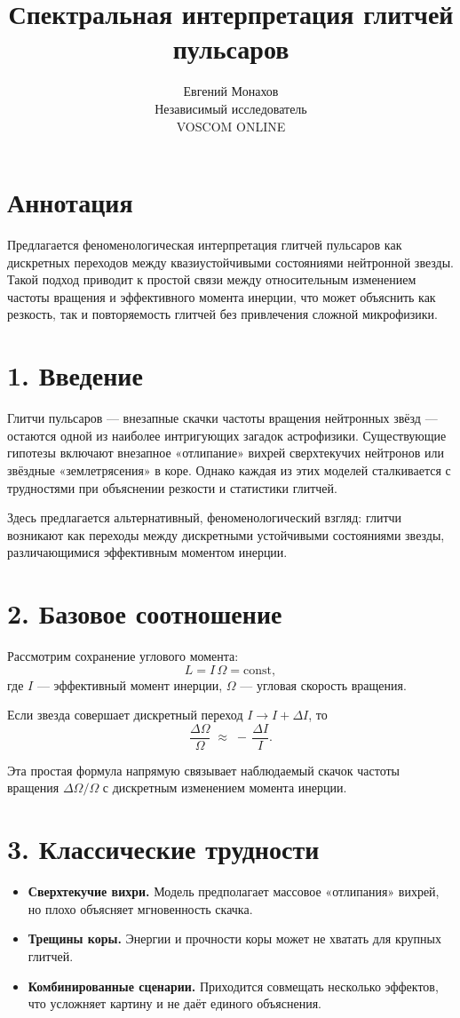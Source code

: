 \documentclass[a4paper,12pt]{article}
\begin{document}
\title{Спектральная интерпретация глитчей пульсаров}
\author{Евгений Монахов \\ Независимый исследователь \\ VOSCOM ONLINE}
\date{}
\maketitle

\section*{Аннотация}
Предлагается феноменологическая интерпретация глитчей пульсаров как дискретных переходов между квазиустойчивыми состояниями нейтронной звезды. Такой подход приводит к простой связи между относительным изменением частоты вращения и эффективного момента инерции, что может объяснить как резкость, так и повторяемость глитчей без привлечения сложной микрофизики.

\section*{1. Введение}
Глитчи пульсаров --- внезапные скачки частоты вращения нейтронных звёзд --- остаются одной из наиболее интригующих загадок астрофизики. Существующие гипотезы включают внезапное «отлипание» вихрей сверхтекучих нейтронов или звёздные «землетрясения» в коре. Однако каждая из этих моделей сталкивается с трудностями при объяснении резкости и статистики глитчей.

Здесь предлагается альтернативный, феноменологический взгляд: глитчи возникают как переходы между дискретными устойчивыми состояниями звезды, различающимися эффективным моментом инерции.

\section*{2. Базовое соотношение}
Рассмотрим сохранение углового момента:
\[
L = I \, \Omega = \text{const},
\]
где $I$ --- эффективный момент инерции, $\Omega$ --- угловая скорость вращения.

Если звезда совершает дискретный переход $I \to I + \Delta I$, то
\[
\frac{\Delta \Omega}{\Omega} \;\approx\; -\, \frac{\Delta I}{I}.
\]

Эта простая формула напрямую связывает наблюдаемый скачок частоты вращения $\Delta \Omega / \Omega$ с дискретным изменением момента инерции.

\section*{3. Классические трудности}
\begin{itemize}
  \item \textbf{Сверхтекучие вихри.} Модель предполагает массовое «отлипания» вихрей, но плохо объясняет мгновенность скачка.
  \item \textbf{Трещины коры.} Энергии и прочности коры может не хватать для крупных глитчей.
  \item \textbf{Комбинированные сценарии.} Приходится совмещать несколько эффектов, что усложняет картину и не даёт единого объяснения.
\end{itemize}
\end{document}
